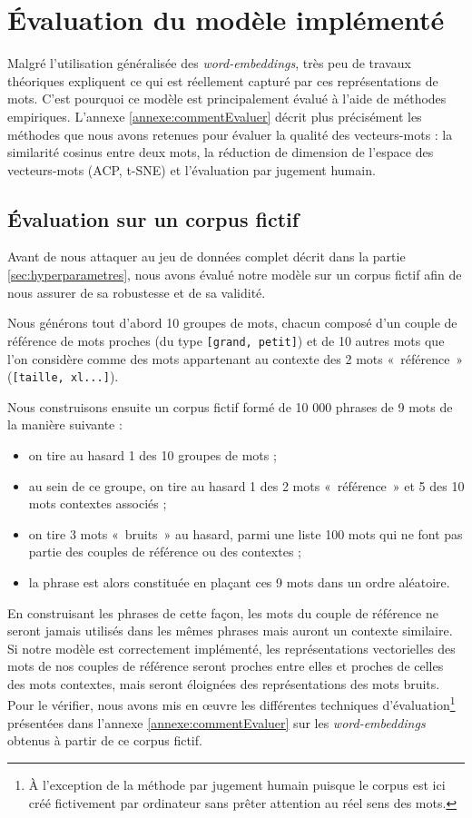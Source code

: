 \documentclass[11pt,french,french]{article}
\providecommand{\tightlist}{%
  \setlength{\parskip}{0pt}
  }
\let\rmarkdownfootnote\footnote%
\def\footnote{\protect\rmarkdownfootnote}
\begin{document}
\section{Évaluation du modèle implémenté}\label{sec:evaluation}

Malgré l'utilisation généralisée des \emph{word-embeddings}, très peu de
travaux théoriques expliquent ce qui est réellement capturé par ces
représentations de mots. C'est pourquoi ce modèle est principalement
évalué à l'aide de méthodes empiriques. L'annexe
\ref{annexe:commentEvaluer} décrit plus précisément les méthodes que
nous avons retenues pour évaluer la qualité des vecteurs-mots : la
similarité cosinus entre deux mots, la réduction de dimension de
l'espace des vecteurs-mots (ACP, t-SNE) et l'évaluation par jugement
humain.

\subsection{Évaluation sur un corpus fictif}\label{sec:corpusFictif}

Avant de nous attaquer au jeu de données complet décrit dans la partie
\ref{sec:hyperparametres}, nous avons évalué notre modèle sur un corpus
fictif afin de nous assurer de sa robustesse et de sa validité.

Nous générons tout d'abord 10 groupes de mots, chacun composé d'un
couple de référence de mots proches (du type
\texttt{{[}grand,\ petit{]}}) et de 10 autres mots que l'on considère
comme des mots appartenant au contexte des 2 mots «~référence~»
(\texttt{{[}taille,\ xl...{]}}).

Nous construisons ensuite un corpus fictif formé de 10 000 phrases de 9
mots de la manière suivante :

\begin{itemize}
\tightlist
\item
  on tire au hasard 1 des 10 groupes de mots ;
\item
  au sein de ce groupe, on tire au hasard 1 des 2 mots «~référence~» et
  5 des 10 mots contextes associés ;
\item
  on tire 3 mots «~bruits~» au hasard, parmi une liste 100 mots qui ne
  font pas partie des couples de référence ou des contextes ;
\item
  la phrase est alors constituée en plaçant ces 9 mots dans un ordre
  aléatoire.
\end{itemize}

En construisant les phrases de cette façon, les mots du couple de
référence ne seront jamais utilisés dans les mêmes phrases mais auront
un contexte similaire. Si notre modèle est correctement implémenté, les
représentations vectorielles des mots de nos couples de référence seront
proches entre elles et proches de celles des mots contextes, mais seront
éloignées des représentations des mots bruits. Pour le vérifier, nous
avons mis en œuvre les différentes techniques d'évaluation\footnote{À
  l'exception de la méthode par \og jugement humain \fg{} puisque le
  corpus est ici créé fictivement par ordinateur sans prêter attention
  au réel sens des mots.} présentées dans l'annexe
\ref{annexe:commentEvaluer} sur les \emph{word-embeddings} obtenus à
partir de ce corpus fictif.
\end{document}
